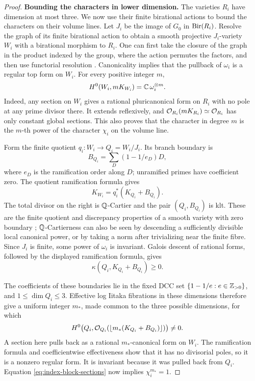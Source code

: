 \begin{proof}
\smallskip\noindent\textbf{Bounding the characters in lower dimension.}
The varieties $R_i$ have dimension at most three. We now use their
finite birational actions to bound the characters on their volume lines.
Let \(J_i\) be the image of \(G_0\) in \(\operatorname{Bir}(R_i)\).  Resolve the graph
of its finite birational action to obtain a smooth projective
\(J_i\)-variety \(W_i\) with a birational morphism to \(R_i\).  One can
first take the closure of the graph in the product indexed by the group,
where the action permutes the factors, and then use functorial resolution
\cite[Theorem~1.1]{BierstoneMilman2008}.  Canonicality implies that the pullback
of \(\omega_i\) is a regular top form on \(W_i\).  For every positive
integer \(m\),
\begin{equation}\label{eq:index-block-sections}
          H^0(W_i,mK_{W_i})=\mathbb C\,\omega_i^{\otimes m}.
\end{equation}
Indeed, any section on \(W_i\) gives a rational pluricanonical form on
\(R_i\) with no pole at any prime divisor there.  It extends reflexively,
and \(\mathcal O_{R_i}(mK_{R_i})\simeq\mathcal O_{R_i}\) has only constant global
sections.  This also proves that the character in degree \(m\) is the
\(m\)-th power of the character \(\chi_i\) on the volume line.

Form the finite quotient \(q_i:W_i\to Q_i=W_i/J_i\).  Its branch boundary is
\[
             B_{Q_i}=\sum_D(1-1/e_D)D,
\]
where \(e_D\) is the ramification order along \(D\); unramified primes
have coefficient zero.  The quotient ramification formula gives
\[
                 K_{W_i}=q_i^*(K_{Q_i}+B_{Q_i}).
\]
The total divisor on the right is \(\mathbb Q\)-Cartier and the pair
\((Q_i,B_{Q_i})\) is klt.  These are the finite quotient and discrepancy
properties of a smooth variety with zero boundary
\cite[Proposition~5.20]{KollarMori1998}; \(\mathbb Q\)-Cartierness can also be
seen by descending a sufficiently divisible local canonical power, or
by taking a norm after trivializing near the finite fibre.  Since \(J_i\)
is finite, some power of \(\omega_i\) is invariant.  Galois descent of
rational forms, followed by the displayed ramification formula, gives
\[
                     \kappa(Q_i,K_{Q_i}+B_{Q_i})\ge0.
\]

The coefficients of these boundaries lie in the fixed DCC set
\(\{1-1/e:e\in\mathbb Z_{>0}\}\), and \(1\le\dim Q_i\le3\).  Effective log Iitaka
fibrations in these dimensions
\cite[Corollary~1.5]{ChenHanLiu2023} therefore give a uniform integer
\(m_*\), made common to the three possible dimensions, for which
\[
     H^0\bigl(Q_i,\mathcal O_{Q_i}(\lfloor m_*(K_{Q_i}+B_{Q_i})\rfloor)\bigr)
                    \ne0.
\]
A section here pulls back as a rational \(m_*\)-canonical form on
\(W_i\).  The ramification formula and coefficientwise effectiveness
show that it has no divisorial poles, so it is a nonzero regular form.
It is invariant because it was pulled back from \(Q_i\).  Equation
\eqref{eq:index-block-sections} now implies \(\chi_i^{m_*}=1\).


\end{proof}
